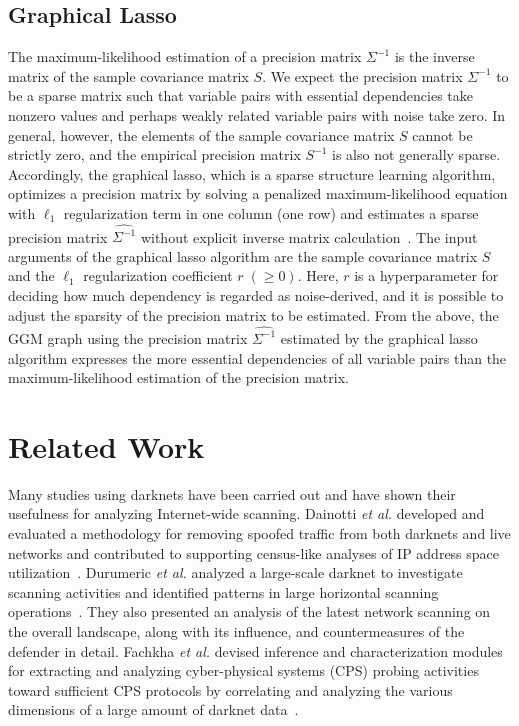 \documentclass[conference]{IEEEtran}
\begin{document}
\subsection{Graphical Lasso}
The maximum-likelihood estimation of a precision matrix $\Sigma^{-1}$ is the inverse matrix of the sample covariance matrix $S$.
We expect the precision matrix $\Sigma^{-1}$ to be a sparse matrix such that variable pairs with essential dependencies take nonzero values and perhaps weakly related variable pairs with noise take zero.
In general, however, the elements of the sample covariance matrix $S$ cannot be strictly zero, and the empirical precision matrix $S^{-1}$ is also not generally sparse.
Accordingly, the graphical lasso, which is a sparse structure learning algorithm, optimizes a precision matrix by solving a penalized maximum-likelihood equation with $\ell_1$ regularization term in one column (one row) and estimates a sparse precision matrix $\hat{\Sigma^{-1}}$ without explicit inverse matrix calculation~\cite{Friedman}.
The input arguments of the graphical lasso algorithm are the sample covariance matrix $S$ and the $\ell_1$ regularization coefficient $r\;(\geq 0)$.
Here, $r$ is a hyperparameter for deciding how much dependency is regarded as noise-derived, and it is possible to adjust the sparsity of the precision matrix to be estimated.
From the above, the GGM graph using the precision matrix $\hat{\Sigma^{-1}}$ estimated by the graphical lasso algorithm expresses the more essential dependencies of all variable pairs than the maximum-likelihood estimation of the precision matrix.



\section{Related Work}
Many studies using darknets have been carried out and have shown their usefulness for analyzing Internet-wide scanning.
Dainotti {\it et al.} developed and evaluated a methodology for removing spoofed traffic from both darknets and live networks and contributed to supporting census-like analyses of IP address space utilization~\cite{Dainotti}.
Durumeric {\it et al.} analyzed a large-scale darknet to investigate scanning activities and identified patterns in large horizontal scanning operations~\cite{Durumeric}.
They also presented an analysis of the latest network scanning on the overall landscape, along with its influence, and countermeasures of the defender in detail.
Fachkha {\it et al.} devised inference and characterization modules for extracting and analyzing cyber-physical systems (CPS) probing activities toward sufficient CPS protocols by correlating and analyzing the various dimensions of a large amount of darknet data~\cite{Fachkha}.
\end{document}
